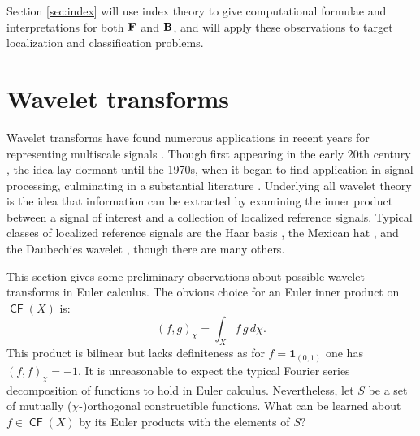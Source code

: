 \documentclass{psapm-l}
\theoremstyle{definition}
\theoremstyle{remark}
\numberwithin{equation}{section}
\begin{document}
Section \ref{sec:index} will use index theory to give computational formulae and interpretations for both ${{\bf F}}$ and ${{\bf B}}$, and will apply these observations to target localization and classification problems.

\section{Wavelet transforms}
\label{sec:wavelet}

Wavelet transforms have found numerous applications in recent years for representing multiscale signals \cite{Usevitch_2001,Bradley_1994,Wang_1996}. Though first appearing in the early 20th century \cite{Haar_1909}, the idea lay dormant until the 1970s, when it began to find application in signal processing, culminating in a substantial literature \cite{Daubechies_1992,Graps_1995,Hubbard_1998}. Underlying all wavelet theory is the idea that information can be extracted by examining the inner product between a signal of interest and a collection of localized reference signals.  Typical classes of localized reference signals are the Haar basis \cite{Haar_1909}, the Mexican hat \cite{Brinks_2008}, and the Daubechies wavelet \cite{Daubechies_1992}, though there are many others.

This section gives some preliminary observations about possible wavelet transforms in Euler calculus.  The obvious choice for an Euler inner product on ${{{\operatorname{\mathsf{{CF}}}}}}(X)$ is:
\begin{equation}
\label{eulerinnerproduct}
    (f,g)_\chi=\int_X f\,g \, d\chi.
\end{equation}
This product is bilinear but lacks definiteness as for $f={{\mathbf{1}}}_{(0,1)}$ one has $(f,f)_\chi=-1$. It is
unreasonable to expect the typical Fourier series decomposition of functions to hold in Euler calculus.
Nevertheless, let $S$ be a set of mutually ($\chi$-)orthogonal constructible functions.  What can be learned about $f\in {{{\operatorname{\mathsf{{CF}}}}}}(X)$ by its Euler products with the elements of $S$?
\end{document}
